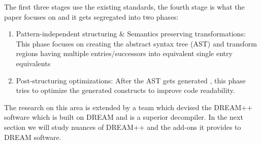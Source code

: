 \documentclass[11pt]{article}
\begin{document}
		The first three stages use the existing standards, the fourth stage is what the paper focuses on and it gets segregated into two phases:
		\begin{enumerate}
			\item Pattern-independent structuring \& Semantics preserving transformations: This phase focuses on creating the abstract syntax tree (AST) and transform regions having multiple entries/successors into equivalent single entry equivalents
			\item Post-structuring optimizations: After the AST gets generated , this phase tries to optimize the generated constructs to improve code readability.
		\end{enumerate}
		The research on this area is extended by a team which devised the DREAM++ software which is built on DREAM and is a superior decompiler. In the next section we will study nuances of DREAM++ and the add-ons it provides to DREAM software.
		
\end{document}
